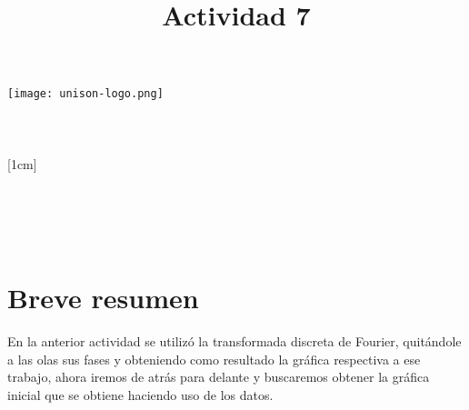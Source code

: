 \documentclass[a4paper,12pt]{article}
\title{Actividad 7}
\author{}
\newcommand{\vacio}{\textcolor{white}{holacaracola}}
\newcommand{\director}{Carlos Lizárraga Celaya}
\begin{document}
\begin{titlepage}
\begin{center}
\vspace{1cm}

\texttt{[image: unison-logo.png]}
\\[0.5cm]
{\fontsize{24}{6}\selectfont{UNIVERSIDAD DE SONORA}}\\
[1em]
{\fontsize{16}{5}\selectfont{DEPARTAMENTO DE FÍSICA}}\\
[4em]
\textcolor{azulportada}
{\fontsize{30}{5}\selectfont{\textsc{\thetitle}}}\\
[1cm]
{\fontsize{16}{5}\selectfont{Alumno:}}\\
[0.2cm]
{\fontsize{14}{5}\selectfont{Luis Alfonso Torres Flores}}\\
[1cm]
{\fontsize{16}{5}\selectfont{Profesor}}\\
[0.2cm]
{\fontsize{16}{5}\selectfont{\director}}\\
[4.5cm]
{\fontsize{14}{5}\selectfont{18 de Abril de 2017}}\\
[4cm]
\end{center}
\restoregeometry
\end{titlepage}

\newpage
\renewcommand{\headrulewidth}{0.5pt}
\fancyhead[L]{\vacio}

\newpage
\tableofcontents
\newpage
\section{Breve resumen}
\noindent
En la anterior actividad se utilizó la transformada discreta de Fourier, quitándole a las olas sus fases y obteniendo como resultado la gráfica respectiva a ese trabajo, ahora iremos de atrás para delante y buscaremos obtener la gráfica inicial que se obtiene haciendo uso de los datos.
\end{document}

